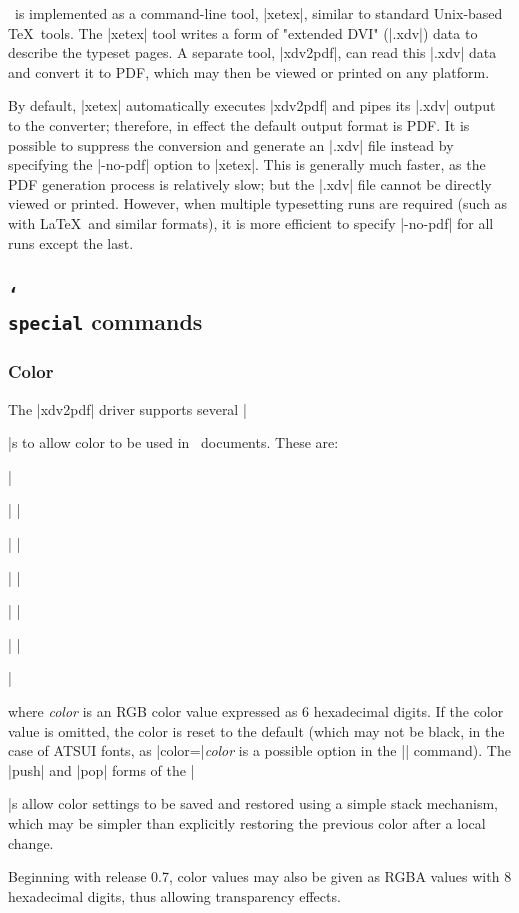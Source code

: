 \XeTeX\ is implemented as a command-line tool, |xetex|, similar to standard Unix-based \TeX\ tools. The |xetex| tool writes a form of "extended DVI" (|.xdv|) data to describe the typeset pages. A separate tool, |xdv2pdf|, can read this |.xdv| data and convert it to PDF, which may then be viewed or printed on any platform.

By default, |xetex| automatically executes |xdv2pdf| and pipes its |.xdv| output to the converter; therefore, in effect the default output format is PDF. It is possible to suppress the conversion and generate an |.xdv| file instead by specifying the |-no-pdf| option to |xetex|. This is generally much faster, as the PDF generation process is relatively slow; but the |.xdv| file cannot be directly viewed or printed. However, when multiple typesetting runs are required (such as with \LaTeX\ and similar formats), it is more efficient to specify |-no-pdf| for all runs except the last.

\subsection{\texttt{\char`\\special} commands}

\subsubsection{Color}

The |xdv2pdf| driver supports several |\special|s to allow color to be used in \XeTeX\ documents. These are:
{\obeylines \parskip0pt \parindent
	||
	||
	||
	||
	||
	||\par}\noindent
where {\em color} is an RGB color value expressed as 6 hexadecimal digits. If the color value is omitted, the color is reset to the default (which may not be black, in the case of ATSUI fonts, as |color=|{\em color} is a possible option in the |\font| command). The |push| and |pop| forms of the |\special|s allow color settings to be saved and restored using a simple stack mechanism, which may be simpler than explicitly restoring the previous color after a local change.

Beginning with release 0.7, color values may also be given as RGBA values with 8 hexadecimal digits, thus allowing transparency effects.

